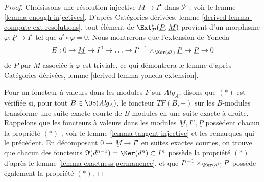 \begin{proof}
Choisissons une résolution injective $\underline{M} \to I^\bullet$ dans
$\mathcal{P}$ ; voir le
lemme \ref{lemma-enough-injectives}.
D'après
Catégories dérivées, lemme \ref{derived-lemma-compute-ext-resolutions},
tout élément de $\Ext^i_\mathcal{P}(\underline{P}, \underline{M})$
provient d'un morphisme $\varphi : \underline{P} \to I^i$ tel que
$d^i \circ \varphi = 0$. Nous montrerons que
l'extension de Yoneda
$$
E : 0 \to \underline{M} \to I^0 \to \ldots \to
I^{i - 1} \times_{\Ker(d^i)} \underline{P} \to \underline{P} \to 0
$$
de $\underline{P}$ par $\underline{M}$
associée à $\varphi$ est triviale, ce qui démontrera le lemme d'après
Catégories dérivées, lemme \ref{derived-lemma-yoneda-extension}.

\medskip\noindent
Pour un foncteur à valeurs dans les modules $F$ sur $\textit{Alg}_A$,
disons que $(*)$ est vérifiée si, pour tout $B \in \Ob(\textit{Alg}_A)$, le
foncteur $TF(B, -)$ sur les $B$-modules transforme une suite exacte courte
de $B$-modules en une suite exacte à droite.
Rappelons que les foncteurs à valeurs dans les modules $\underline{M}, I^n, \underline{P}$
possèdent chacun la propriété $(*)$ ; voir le
lemme \ref{lemma-tangent-injective}
et les remarques qui le précèdent.
En décomposant $0 \to \underline{M} \to I^\bullet$ en suites exactes
courtes, on trouve que chacun des foncteurs
$\Im(d^{n - 1}) = \Ker(d^n) \subset I^n$ possède la propriété $(*)$ d'après le
lemme \ref{lemma-exactness-permanence},
et que $I^{i - 1} \times_{\Ker(d^i)} \underline{P}$ possède également la propriété
$(*)$.


\end{proof}
